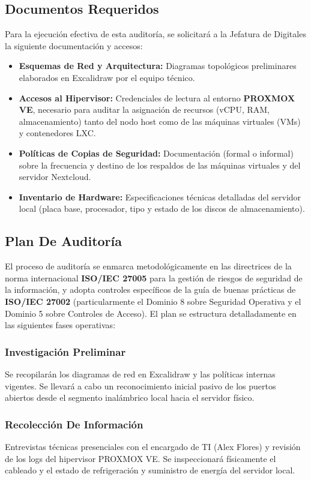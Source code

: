 \documentclass[12pt]{article}
\begin{document}
\subsection{Documentos Requeridos}
Para la ejecución efectiva de esta auditoría, se solicitará a la Jefatura de Digitales la siguiente documentación y accesos:
\begin{itemize}
    \item \textbf{Esquemas de Red y Arquitectura:} Diagramas topológicos preliminares elaborados en Excalidraw por el equipo técnico.
    \item \textbf{Accesos al Hipervisor:} Credenciales de lectura al entorno \textbf{PROXMOX VE}, necesario para auditar la asignación de recursos (vCPU, RAM, almacenamiento) tanto del nodo host como de las máquinas virtuales (VMs) y contenedores LXC.
    \item \textbf{Políticas de Copias de Seguridad:} Documentación (formal o informal) sobre la frecuencia y destino de los respaldos de las máquinas virtuales y del servidor Nextcloud.
    \item \textbf{Inventario de Hardware:} Especificaciones técnicas detalladas del servidor local (placa base, procesador, tipo y estado de los discos de almacenamiento).
\end{itemize}

\subsection{Plan De Auditoría}
El proceso de auditoría se enmarca metodológicamente en las directrices de la norma internacional \textbf{ISO/IEC 27005} para la gestión de riesgos de seguridad de la información, y adopta controles específicos de la guía de buenas prácticas de \textbf{ISO/IEC 27002} (particularmente el Dominio 8 sobre Seguridad Operativa y el Dominio 5 sobre Controles de Acceso). El plan se estructura detalladamente en las siguientes fases operativas:

\subsubsection{Investigación Preliminar}
Se recopilarán los diagramas de red en Excalidraw y las políticas internas vigentes. Se llevará a cabo un reconocimiento inicial pasivo de los puertos abiertos desde el segmento inalámbrico local hacia el servidor físico.

\subsubsection{Recolección De Información}
Entrevistas técnicas presenciales con el encargado de TI (Alex Flores) y revisión de los logs del hipervisor PROXMOX VE. Se inspeccionará físicamente el cableado y el estado de refrigeración y suministro de energía del servidor local.
\end{document}
